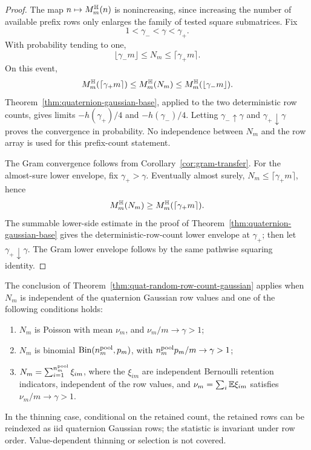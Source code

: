 \begin{proof}
The map \(n\mapsto M_m^{\mathbb{H}}(n)\) is nonincreasing, since increasing the number
of available prefix rows only enlarges the family of tested square submatrices.
Fix
\[
  1<\gamma_-<\gamma<\gamma_+ .
\]
With probability tending to one,
\[
  \lfloor\gamma_-m\rfloor\le N_m\le\lceil\gamma_+m\rceil .
\]
On this event,
\[
  M_m^{\mathbb{H}}(\lceil\gamma_+m\rceil)
  \le M_m^{\mathbb{H}}(N_m)
  \le M_m^{\mathbb{H}}(\lfloor\gamma_-m\rfloor).
\]
Theorem~\ref{thm:quaternion-gaussian-base}, applied to the two deterministic
row counts, gives limits \(-h(\gamma_+)/4\) and \(-h(\gamma_-)/4\).  Letting
\(\gamma_-\uparrow\gamma\) and \(\gamma_+\downarrow\gamma\) proves the
convergence in probability.  No independence between \(N_m\) and the row array
is used for this prefix-count statement.

The Gram convergence follows from Corollary~\ref{cor:gram-transfer}.  For the
almost-sure lower envelope, fix \(\gamma_+>\gamma\).  Eventually almost surely,
\(N_m\le\lceil\gamma_+m\rceil\), hence
\[
  M_m^{\mathbb{H}}(N_m)\ge M_m^{\mathbb{H}}(\lceil\gamma_+m\rceil).
\]
The summable lower-side estimate in the proof of
Theorem~\ref{thm:quaternion-gaussian-base} gives the deterministic-row-count
lower envelope at \(\gamma_+\); then let \(\gamma_+\downarrow\gamma\).  The
Gram lower envelope follows by the same pathwise squaring identity.
\end{proof}

\begin{corollary}\label{cor:quat-poisson-thinning}
The conclusion of Theorem~\ref{thm:quat-random-row-count-gaussian} applies when
\(N_m\) is independent of the quaternion Gaussian row values and one of the
following conditions holds:
\begin{enumerate}
\item \(N_m\) is Poisson with mean \(\nu_m\), and \(\nu_m/m\to\gamma>1\);
\item \(N_m\) is binomial \(\operatorname{Bin}(n_m^{\rm pool},p_m)\), with
      \(n_m^{\rm pool}p_m/m\to\gamma>1\);
\item \(N_m=\sum_{i=1}^{n_m^{\rm pool}}\xi_{im}\), where the \(\xi_{im}\) are
      independent Bernoulli retention indicators, independent of the row
      values, and \(\nu_m=\sum_i\mathbb{E}\xi_{im}\) satisfies
      \(\nu_m/m\to\gamma>1\).
\end{enumerate}
In the thinning case, conditional on the retained count, the retained rows can
be reindexed as iid quaternion Gaussian rows; the statistic is invariant under
row order.  Value-dependent thinning or selection is not covered.
\end{corollary}

